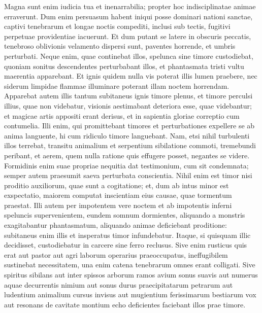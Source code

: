 \begin{biblechapter}
\begin{biblechapter}
\begin{biblechapter}
\begin{biblechapter}
\begin{biblechapter}
\begin{biblechapter}
\begin{biblechapter}
\begin{biblechapter}
\begin{biblechapter}
\begin{biblechapter}
\begin{biblechapter}
\begin{biblechapter}
\begin{biblechapter}
\begin{biblechapter}
\begin{biblechapter}
\begin{biblechapter}
\begin{biblechapter}
\verse Magna sunt enim iudicia tua et inenarrabilia;
 propter hoc indisciplinatae animae erraverunt.
 \verse Dum enim persuasum habent iniqui posse dominari nationi sanctae,
 captivi tenebrarum et longae noctis compediti,
 inclusi sub tectis, fugitivi perpetuae providentiae iacuerunt.
 \verse Et dum putant se latere in obscuris peccatis,
 tenebroso oblivionis velamento
 dispersi sunt, paventes horrende,
 et umbris perturbati.
 \verse Neque enim, quae continebat illos, spelunca sine timore custodiebat,
 quoniam sonitus descendentes perturbabant illos,
 et phantasmata tristi vultu maerentia apparebant.
 \verse Et ignis quidem nulla vis poterat illis lumen praebere,
 nec siderum limpidae flammae
 illuminare poterant illam noctem horrendam.
 \verse Apparebat autem illis tantum subitaneus ignis timore plenus,
 et timore perculsi illius, quae non videbatur, visionis
 aestimabant deteriora esse, quae videbantur;
 \verse et magicae artis appositi erant derisus,
 et in sapientia gloriae correptio cum contumelia.
 \verse Illi enim, qui promittebant
 timores et perturbationes expellere se ab anima languente,
 hi cum ridiculo timore languebant.
 \verse Nam, etsi nihil turbulenti illos terrebat,
 transitu animalium et serpentium sibilatione commoti,
 tremebundi peribant,
 et aerem, quem nulla ratione quis effugere posset, negantes se videre.
 \verse Formidinis enim suae propriae nequitia dat testimonium,
 cum sit condemnata;
 semper autem praesumit saeva perturbata conscientia.
 \verse Nihil enim est timor nisi proditio auxiliorum, quae sunt a cogitatione;
 \verse et, dum ab intus minor est exspectatio,
 maiorem computat inscientiam eius causae, quae tormentum praestat.
 \verse Illi autem per impotentem vere noctem
 et ab impotentis inferni speluncis supervenientem,
 eundem somnum dormientes,
 \verse aliquando a monstris exagitabantur phantasmatum,
 aliquando animae deficiebant proditione:
 subitaneus enim illis et insperatus timor infundebatur.
 \verse Itaque, si quisquam illic decidisset,
 custodiebatur in carcere sine ferro reclusus.
 \verse Sive enim rusticus quis erat aut pastor
 aut agri laborum operarius praeoccupatus,
 ineffugibilem sustinebat necessitatem,
 una enim catena tenebrarum omnes erant colligati.
 \verse Sive spiritus sibilans
 aut inter spissos arborum ramos avium sonus suavis
 aut numerus aquae decurrentis nimium
 aut sonus durus praecipitatarum petrarum
 \verse aut ludentium animalium cursus invisus
 aut mugientium ferissimarum bestiarum vox
 aut resonans de cavitate montium echo
 deficientes faciebant illos prae timore.

\end{biblechapter}
\end{biblechapter}
\end{biblechapter}
\end{biblechapter}
\end{biblechapter}
\end{biblechapter}
\end{biblechapter}
\end{biblechapter}
\end{biblechapter}
\end{biblechapter}
\end{biblechapter}
\end{biblechapter}
\end{biblechapter}
\end{biblechapter}
\end{biblechapter}
\end{biblechapter}
\end{biblechapter}

